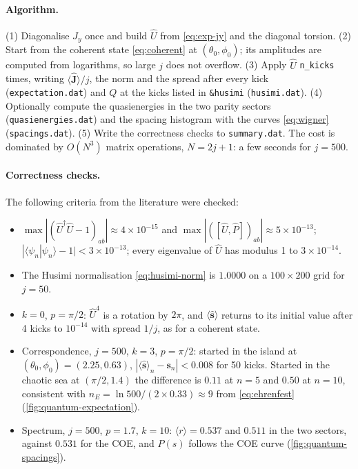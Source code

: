\documentclass[11pt,a4paper]{article}
\newcommand{\vJ}{\bm{J}}
\begin{document}
\paragraph{Algorithm.} (1) Diagonalise $\hat J_y$ once and build $\hat U$ from \eqref{eq:exp-jy} and the diagonal torsion.
(2) Start from the coherent state \eqref{eq:coherent} at $(\theta_0,\phi_0)$; its amplitudes are computed from
logarithms, so large $j$ does not overflow. (3) Apply $\hat U$ \texttt{n\_kicks} times, writing
$\langle\hat{\vJ}\rangle/j$, the norm and the spread after every kick (\texttt{expectation.dat}) and $Q$ at the kicks
listed in \texttt{\&husimi} (\texttt{husimi.dat}). (4) Optionally compute the quasienergies in the two parity sectors
(\texttt{quasienergies.dat}) and the spacing histogram with the curves \eqref{eq:wigner} (\texttt{spacings.dat}).
(5) Write the correctness checks to \texttt{summary.dat}. The cost is dominated by $O(N^3)$ matrix operations,
$N = 2j+1$: a few seconds for $j = 500$.

\paragraph{Correctness checks.} The following criteria from the literature \cite{Haake,HKS1987,Atas2013} were checked:
\begin{itemize}
  \item $\max|(\hat U^\dagger\hat U - 1)_{ab}| \approx 4\times10^{-15}$ and $\max|([\hat U,\hat P])_{ab}| \approx
  5\times10^{-13}$; $|\langle\psi_n|\psi_n\rangle - 1| < 3\times10^{-13}$; every eigenvalue of $\hat U$ has modulus 1
  to $3\times10^{-14}$.
  \item The Husimi normalisation \eqref{eq:husimi-norm} is $1.0000$ on a $100\times200$ grid for $j = 50$.
  \item $k = 0$, $p = \pi/2$: $\hat U^4$ is a rotation by $2\pi$, and $\langle\hat{\bm s}\rangle$ returns to its initial
  value after 4 kicks to $10^{-14}$ with spread $1/j$, as for a coherent state.
  \item Correspondence, $j = 500$, $k = 3$, $p=\pi/2$: started in the island at $(\theta_0,\phi_0) = (2.25, 0.63)$,
  $|\langle\hat{\bm s}\rangle_n - \bm s_n| < 0.008$ for 50 kicks. Started in the chaotic sea at $(\pi/2, 1.4)$ the
  difference is $0.11$ at $n = 5$ and $0.50$ at $n = 10$, consistent with $n_E = \ln 500/(2\times0.33) \approx 9$
  from \eqref{eq:ehrenfest} (\cref{fig:quantum-expectation}).
  \item Spectrum, $j = 500$, $p = 1.7$, $k = 10$: $\langle r\rangle = 0.537$ and $0.511$ in the two sectors,
  against $0.531$ for the COE, and $P(s)$ follows the COE curve (\cref{fig:quantum-spacings}).
\end{itemize}
\end{document}
